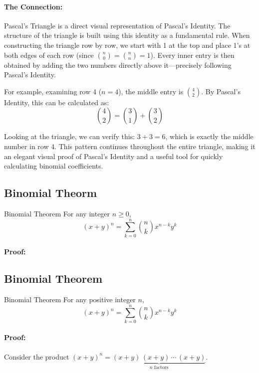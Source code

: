 \paragraph{The Connection:}
Pascal's Triangle is a direct visual representation of Pascal's Identity. The structure of the triangle is built using this identity as a fundamental rule. When constructing the triangle row by row, we start with 1 at the top and place 1's at both edges of each row (since $\binom{n}{0} = \binom{n}{n} = 1$). Every inner entry is then obtained by adding the two numbers directly above it—precisely following Pascal's Identity.

For example, examining row 4 ($n = 4$), the middle entry is $\binom{4}{2}$. By Pascal's Identity, this can be calculated as:
\[ \binom{4}{2} = \binom{3}{1} + \binom{3}{2} \]

Looking at the triangle, we can verify this: $3 + 3 = 6$, which is exactly the middle number in row 4. This pattern continues throughout the entire triangle, making it an elegant visual proof of Pascal's Identity and a useful tool for quickly calculating binomial coefficients.


\subsection{Binomial Theorm}
\begin{theoremboxbreak}{Binomial Theorem}
    For any integer \(n \geq 0\),
    \[
    (x + y)^n = \sum_{k=0}^{n} \binom{n}{k} x^{n-k} y^k
    \]
\end{theoremboxbreak}
\paragraph{Proof:}

\subsection{Binomial Theorem}
\begin{theoremboxbreak}{Binomial Theorem}
    For any positive integer \(n\),
    \[
    (x+y)^n = \sum_{k=0}^{n} \binom{n}{k} x^{n-k} y^k
    \]
\end{theoremboxbreak}
\paragraph{Proof:} Consider the product $(x+y)^n = \underbrace{(x+y)\,(x+y)\,\cdots\,(x+y)}_{\text{$n$ factors}}$.

